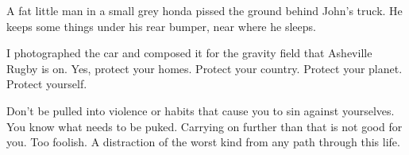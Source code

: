 

A fat little man in a small grey honda pissed the ground behind John's
truck.  He keeps some things under his rear bumper, near where he
sleeps.

I photographed the car and composed it for the gravity field that
Asheville Rugby is on.  Yes, protect your homes.  Protect your
country.  Protect your planet.  Protect yourself.  

Don't be pulled into violence or habits that cause you to sin against
yourselves.  You know what needs to be puked.  Carrying on further
than that is not good for you.  Too foolish.  A distraction of the
worst kind from any path through this life.

\bye
